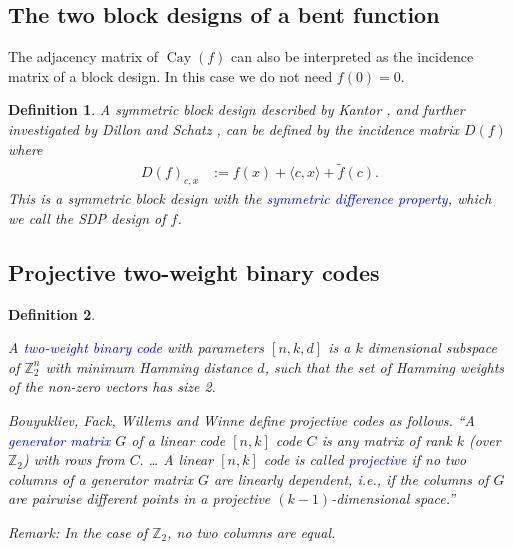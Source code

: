 \documentclass[12pt,a4paper]{article}
\newcommand{\mb}[1]{\mathbb{#1}}
\newcommand{\Z}{\mb{Z}}
\newcommand{\Emph}[1]{\emph{\textcolor{blue}{#1}}}
\newcommand{\Cay}[1]{\operatorname{Cay}\left(#1\right)}
\newcommand{\dual}[1]{\widetilde{#1}}
\newtheorem{Definition}{Definition}
\begin{document}
\subsection{The two block designs of a bent function}

The adjacency matrix of $\Cay{f}$ can also be interpreted as the incidence matrix of a block design.
In this case we do not need $f(0)=0$.

\begin{Definition}
\label{def-SDP-design}
A symmetric block design described by Kantor \cite[Section 5]{Kan75symplectic}, and further
investigated by Dillon and Schatz \cite{DilS87block} \cite[Theorem 3.29]{Neu06bent}, can be defined
by the incidence matrix $D(f)$ where
\begin{align}
D(f)_{c,x} &:= f(x) + \langle c, x \rangle + \dual{f}(c).
\label{D-f-def}
\end{align}
This is a symmetric block design with the \Emph{symmetric difference property},
which we call the \emph{SDP design} of $f$.
\end{Definition}
%
%
\subsection{Projective two-weight binary codes}

\begin{Definition}
\label{def-two-weight-codes}
\cite{BouFFWW2006} \cite{Ton96uniformly}

A \Emph{two-weight binary code} with parameters $[n,k,d]$ is a $k$ dimensional subspace of $\Z_2^n$
with
minimum Hamming distance $d$, such that the set of Hamming weights of the non-zero vectors has size
2.

Bouyukliev, Fack, Willems and Winne \cite[p. 60]{BouFFWW2006} define projective codes as follows.
``A \Emph{generator matrix} $G$ of a linear code $[n, k]$ code $C$ is any matrix
of rank $k$ (over $\Z_2$) with rows from $C.$ \ldots
A linear $[n, k]$ code is called \Emph{projective} if no two columns of a generator matrix
$G$ are linearly dependent, i.e., if the columns of $G$ are pairwise different points in a
projective $(k-1)$-dimensional space.''

Remark: In the case of $\Z_2$, no two columns are equal.
%
%
%
\end{Definition}
\end{document}

